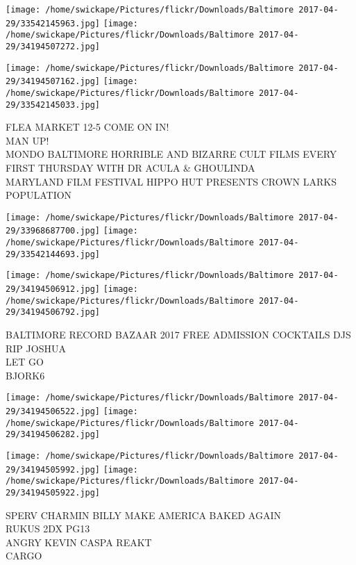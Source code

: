 \documentclass[10pt,letterpaper]{article}
\begin{document}
\texttt{[image: /home/swickape/Pictures/flickr/Downloads/Baltimore 2017-04-29/33542145963.jpg]}
\texttt{[image: /home/swickape/Pictures/flickr/Downloads/Baltimore 2017-04-29/34194507272.jpg]}

\texttt{[image: /home/swickape/Pictures/flickr/Downloads/Baltimore 2017-04-29/34194507162.jpg]}
\texttt{[image: /home/swickape/Pictures/flickr/Downloads/Baltimore 2017-04-29/33542145033.jpg]}

FLEA MARKET 12{-}5 COME ON IN!\\
MAN UP!\\
MONDO BALTIMORE HORRIBLE AND BIZARRE CULT FILMS EVERY FIRST THURSDAY WITH DR ACULA \& GHOULINDA\\
MARYLAND FILM FESTIVAL HIPPO HUT PRESENTS CROWN LARKS POPULATION\\
\pagebreak

\texttt{[image: /home/swickape/Pictures/flickr/Downloads/Baltimore 2017-04-29/33968687700.jpg]}
\texttt{[image: /home/swickape/Pictures/flickr/Downloads/Baltimore 2017-04-29/33542144693.jpg]}

\texttt{[image: /home/swickape/Pictures/flickr/Downloads/Baltimore 2017-04-29/34194506912.jpg]}
\texttt{[image: /home/swickape/Pictures/flickr/Downloads/Baltimore 2017-04-29/34194506792.jpg]}

BALTIMORE RECORD BAZAAR 2017 FREE ADMISSION COCKTAILS DJS\\
RIP JOSHUA\\
LET GO\\
BJORK6\\
\pagebreak

\texttt{[image: /home/swickape/Pictures/flickr/Downloads/Baltimore 2017-04-29/34194506522.jpg]}
\texttt{[image: /home/swickape/Pictures/flickr/Downloads/Baltimore 2017-04-29/34194506282.jpg]}

\texttt{[image: /home/swickape/Pictures/flickr/Downloads/Baltimore 2017-04-29/34194505992.jpg]}
\texttt{[image: /home/swickape/Pictures/flickr/Downloads/Baltimore 2017-04-29/34194505922.jpg]}

SPERV CHARMIN BILLY MAKE AMERICA BAKED AGAIN\\
RUKUS 2DX PG13\\
ANGRY KEVIN CASPA REAKT\\
CARGO\\
\pagebreak
\end{document}
